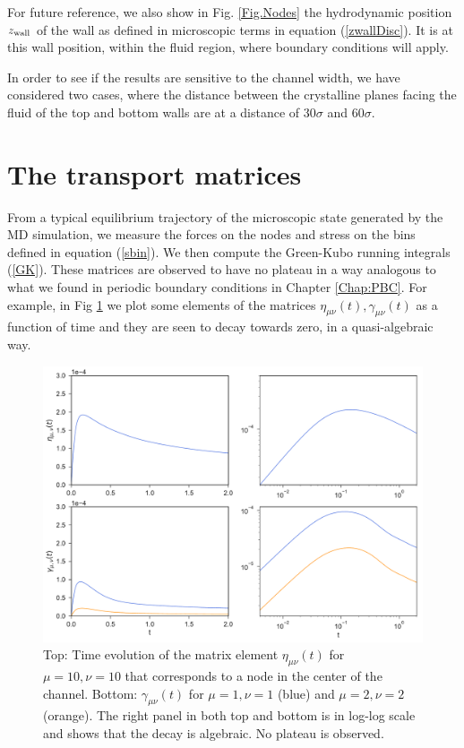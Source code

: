 \documentclass[b5paper,openright,10pt]{book}
\begin{document}
For  future  reference,  we  also show  in  Fig.  \ref{Fig.Nodes}  the
hydrodynamic  position  $z_{\rm  wall}$  of the  wall  as  defined  in
microscopic  terms in  equation   (\ref{zwallDisc}).  It  is  at this  wall
position,  within the  fluid  region, where  boundary conditions  will
apply.

In order to see if the results are sensitive to
the channel  width, we have  considered two cases, where  the distance
between the crystalline planes facing the  fluid of the top and bottom
walls are at a distance of $30\sigma$ and $60\sigma$.

\section{The transport matrices}
From  a  typical  equilibrium  trajectory  of  the  microscopic  state
generated by the MD simulation, we measure the forces on the nodes and
stress on  the bins defined in  equation (\ref{sbin}). We then  compute the
Green-Kubo running integrals (\ref{GK}).   These matrices are observed
to have  no plateau in  a way analogous to  what we found  in periodic
boundary   conditions  in Chapter \ref{Chap:PBC}.
For   example,  in   Fig
\ref{Fig.noplateau}   we   plot   some  elements   of   the   matrices
$\eta_{\mu\nu}(t),\gamma_{\mu\nu}(t)$ as  a function of time  and they
are seen to decay towards zero, in a quasi-algebraic way.

\begin{figure}[]
  \centering
\includegraphics[width=\linewidth]{NoPlateau-WALLS-17nodes}
\caption[Time evolution of the matrix element $\eta_{\mu\nu}$ for a confined fluid - Thick bins]{Top: Time evolution of  the matrix element $\eta_{\mu\nu}(t)$
  for $\mu=10,\nu=10$ that corresponds to a  node in the center of the
    channel. Bottom:  $\gamma_{\mu\nu}(t)$ for $\mu=1,\nu=1$  (blue) and
  $\mu=2,\nu=2$ (orange).  The right panel in both top and bottom is in log-log scale and shows that
  the decay is algebraic. No plateau is observed.}
\label{Fig.noplateau}
\end{figure}
\end{document}
